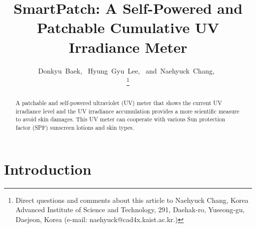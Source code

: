 \documentclass[journal]{IEEEtran}
\begin{document}
\title{SmartPatch: A Self-Powered and Patchable Cumulative UV Irradiance Meter}

\author{
	Donkyu~Baek,~
	Hyung~Gyu~Lee,~
	and~Naehyuck~Chang,~

\thanks{Direct questions and comments about this article to Naehyuck Chang, Korea Advanced Institute of Science and Technology, 291, Daehak-ro, Yuseong-gu, Daejeon, Korea (e-mail: naehyuck@cad4x.kaist.ac.kr.)}
}

\maketitle

\begin{abstract}
A patchable and self-powered ultraviolet (UV) meter that shows the current UV irradiance level and the UV irradiance accumulation provides a more scientific measure to avoid skin damages. This UV meter can cooperate with various Sun protection factor (SPF) sunscreen lotions and skin types.
\end{abstract}



\section{Introduction}
\end{document}
